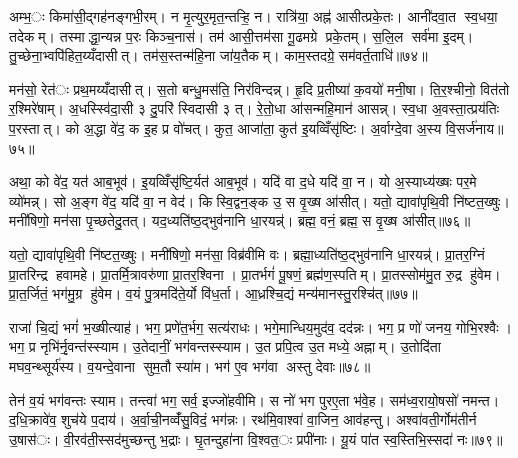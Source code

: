 अम्भ॒ः किमा॑सी॒द्गह॑नङ्गभी॒रम्। न मृ॒त्युर॒मृत॒न्तऱ्हि॒ न। रात्रि॑या॒ अह्न॑ आसीत्प्रके॒तः। आनी॑दवा॒त स्व॒धया॒ तदेकम्। तस्माद्धा॒न्यन्न प॒रः किञ्च॒नास॑। तम॑ आसी॒त्तम॑सा गू॒ढमग्रे प्रके॒तम्। स॒लि॒ल सर्व॑मा इ॒दम्। तु॒च्छेना॒भ्वपि॑हित॒य्यँदासीत्। तम॑स॒स्तन्म॑हि॒ना जा॑य॒तैकम्। काम॒स्तदग्रे॒ सम॑वर्त॒ताधि॑॥७४॥

मन॑सो॒ रेत॑ः प्रथ॒मय्यँदासीत्। स॒तो बन्धु॒मस॑ति॒ निर॑विन्दन्न्। हृ॒दि प्र॒तीष्या॑ क॒वयो॑ मनी॒षा। ति॒र॒श्चीनो॒ वित॑तो र॒श्मिरे॑षाम्। अ॒धस्स्वि॑दा॒सी ३ दु॒परि॑ स्विदासी ३ त्। रे॒तो॒धा आ॑सन्महि॒मान॑ आसन्न्। स्व॒धा अ॒वस्ता॒त्प्रय॑तिः प॒रस्तात्। को अ॒द्धा वे॑द॒ क इ॒ह प्र वो॑चत्। कुत॒ आजा॑ता॒ कुत॑ इ॒यव्विँसृ॑ष्टिः। अ॒र्वाग्दे॒वा अ॒स्य वि॒सर्ज॑नाय॥७५॥

अथा॒ को वे॑द॒ यत॑ आब॒भूव॑। इ॒यव्विँसृ॑ष्टि॒र्यत॑ आब॒भूव॑। यदि॑ वा द॒धे यदि॑ वा॒ न। यो अ॒स्याध्य॑ख्षः पर॒मे व्यो॑मन्न्। सो अ॒ङ्ग वे॑द॒ यदि॑ वा॒ न वेद॑। किस्वि॒द्वन॒ङ्क उ॒ स वृ॒ख्ष आ॑सीत्। यतो॒ द्यावा॑पृथि॒वी नि॑ष्टत॒ख्षुः। मनी॑षिणो॒ मन॑सा पृ॒च्छतेदु॒तत्। यद॒ध्यति॑ष्ठ॒द्भुव॑नानि धा॒रयन्न्॑। ब्रह्म॒ वनं॒ ब्रह्म॒ स वृ॒ख्ष आ॑सीत्॥७६॥

यतो॒ द्यावा॑पृथि॒वी नि॑ष्टत॒ख्षुः। मनी॑षिणो॒ मन॑सा॒ विब्र॑वीमि वः। ब्रह्मा॒ध्यति॑ष्ठ॒द्भुव॑नानि धा॒रयन्न्॑। प्रा॒तर॒ग्निं प्रा॒तरिन्द्र हवामहे। प्रा॒तर्मि॒त्रावरु॑णा प्रा॒तर॒श्विना। प्रा॒तर्भगं॑ पू॒षणं॒ ब्रह्म॑ण॒स्पतिम्। प्रा॒तस्सोम॑मु॒त रु॒द्र हु॑वेम। प्रा॒त॒र्जितं॒ भग॑मु॒ग्र हु॑वेम। व॒यं पु॒त्रमदि॑ते॒र्यो वि॑ध॒र्ता। आ॒ध्रश्चि॒द्यं मन्य॑मानस्तु॒रश्चि॑त्॥७७॥

राजा॑ चि॒द्यं भगं॑ भ॒ख्षीत्याह॑। भग॒ प्रणे॑त॒र्भग॒ सत्य॑राधः। भगे॒मान्धिय॒मुद॑व॒ दद॑न्नः। भग॒ प्र णो॑ जनय॒ गोभि॒रश्वैः। भग॒ प्र नृभि॑र्नृ॒वन्त॑स्स्याम। उ॒तेदानीं॒ भग॑वन्तस्स्याम। उ॒त प्रपि॒त्व उ॒त मध्ये॒ अह्नाम्। उ॒तोदि॑ता मघव॒न्थ्सूर्य॑स्य। व॒यन्दे॒वाना सुम॒तौ स्या॑म। भग॑ ए॒व भग॑वा अस्तु देवाः॥७८॥

तेन॑ व॒यं भग॑वन्तः स्याम। तन्त्वा॑ भग॒ सर्व॒ इज्जो॑हवीमि। स नो॑ भग पुरए॒ता भ॑वे॒ह। सम॑ध्व॒रायो॒षसो॑ नमन्त। द॒धि॒क्रावे॑व॒ शुच॑ये प॒दाय॑। अ॒र्वा॒ची॒नव्वँ॑सु॒विदं॒ भग॑न्नः। रथ॑मि॒वाश्वा॑ वा॒जिन॒ आव॑हन्तु। अश्वा॑वती॒र्गोम॑तीर्न उ॒षास॑ः। वी॒रव॑ती॒स्सद॑मुच्छन्तु भ॒द्राः। घृ॒तन्दुहा॑ना वि॒श्वत॒ः प्रपी॑नाः। यू॒यं पा॑त स्व॒स्तिभि॒स्सदा॑ नः॥७९॥



